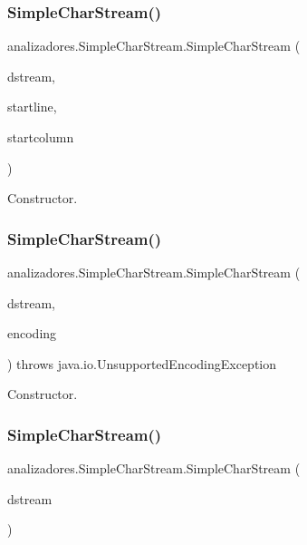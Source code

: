 \subsubsection{\texorpdfstring{Simple\+Char\+Stream()}{SimpleCharStream()}\hspace{0.1cm}{\footnotesize\ttfamily [7/9]}}
{\footnotesize\ttfamily analizadores.\+Simple\+Char\+Stream.\+Simple\+Char\+Stream (\begin{DoxyParamCaption}\item[{java.\+io.\+Input\+Stream}]{dstream,  }\item[{int}]{startline,  }\item[{int}]{startcolumn }\end{DoxyParamCaption})}

Constructor. \mbox{\label{classanalizadores_1_1_simple_char_stream_a08a7b1c3bc75056cc19bdbcc1ac42306}} 
\subsubsection{\texorpdfstring{Simple\+Char\+Stream()}{SimpleCharStream()}\hspace{0.1cm}{\footnotesize\ttfamily [8/9]}}
{\footnotesize\ttfamily analizadores.\+Simple\+Char\+Stream.\+Simple\+Char\+Stream (\begin{DoxyParamCaption}\item[{java.\+io.\+Input\+Stream}]{dstream,  }\item[{String}]{encoding }\end{DoxyParamCaption}) throws java.\+io.\+Unsupported\+Encoding\+Exception}

Constructor. \mbox{\label{classanalizadores_1_1_simple_char_stream_aa148a7b81b78a16ddf2a120531d189cb}} 
\subsubsection{\texorpdfstring{Simple\+Char\+Stream()}{SimpleCharStream()}\hspace{0.1cm}{\footnotesize\ttfamily [9/9]}}
{\footnotesize\ttfamily analizadores.\+Simple\+Char\+Stream.\+Simple\+Char\+Stream (\begin{DoxyParamCaption}\item[{java.\+io.\+Input\+Stream}]{dstream }\end{DoxyParamCaption})}

